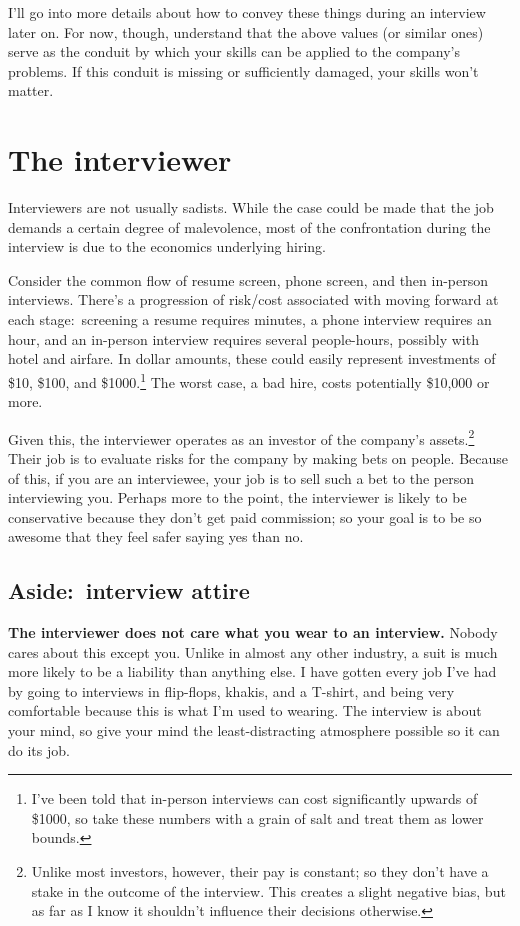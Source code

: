 \documentclass{article}
\begin{document}
  I'll go into more details about how to convey these things during an
  interview later on. For now, though, understand that the above values (or
  similar ones) serve as the conduit by which your skills can be applied to the
  company's problems. If this conduit is missing or sufficiently damaged, your
  skills won't matter.

\section{The interviewer}\label{sec:the-interviewer}
  Interviewers are not usually sadists. While the case could be made that the
  job demands a certain degree of malevolence, most of the confrontation during
  the interview is due to the economics underlying hiring.

  Consider the common flow of resume screen, phone screen, and then in-person
  interviews. There's a progression of risk/cost associated with moving forward
  at each stage:~screening a resume requires minutes, a phone interview
  requires an hour, and an in-person interview requires several people-hours,
  possibly with hotel and airfare. In dollar amounts, these could easily
  represent investments of \$10, \$100, and \$1000.\footnote{I've been told
  that in-person interviews can cost significantly upwards of \$1000, so take
  these numbers with a grain of salt and treat them as lower bounds.} The worst
  case, a bad hire, costs potentially \$10,000 or more.

  Given this, the interviewer operates as an investor of the company's
  assets.\footnote{Unlike most investors, however, their pay is constant; so
  they don't have a stake in the outcome of the interview. This creates a
  slight negative bias, but as far as I know it shouldn't influence their
  decisions otherwise.} Their job is to evaluate risks for the company by
  making bets on people. Because of this, if you are an interviewee, your job
  is to sell such a bet to the person interviewing you. Perhaps more to the
  point, the interviewer is likely to be conservative because they don't get
  paid commission; so your goal is to be so awesome that they feel safer saying
  yes than no.

\subsection{Aside:~interview attire}
  {\bf The interviewer does not care what you wear to an interview.} Nobody
  cares about this except you. Unlike in almost any other industry, a suit is
  much more likely to be a liability than anything else. I have gotten every
  job I've had by going to interviews in flip-flops, khakis, and a T-shirt, and
  being very comfortable because this is what I'm used to wearing. The
  interview is about your mind, so give your mind the least-distracting
  atmosphere possible so it can do its job.
\end{document}
